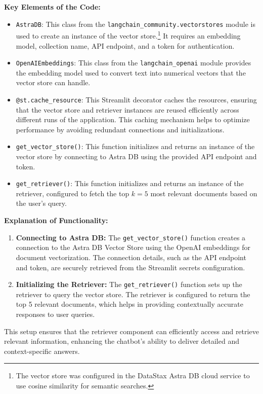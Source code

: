 \textbf{Key Elements of the Code:}
\begin{itemize}
    \item \texttt{AstraDB}: This class from the \texttt{langchain\_community.vectorstores} module is used to create an instance of the vector store.\footnote{The vector store was configured in the DataStax Astra DB cloud service to use cosine similarity for semantic searches.}
    It requires an embedding model, collection name, API endpoint, and a token for authentication.
    \item \texttt{OpenAIEmbeddings}: This class from the \texttt{langchain\_openai} module provides the embedding model used to convert text into numerical vectors that the vector store can handle.
    \item \texttt{@st.cache\_resource}: This Streamlit decorator caches the resources, ensuring that the vector store and retriever instances are reused efficiently across different runs of the application. This caching mechanism helps to optimize performance by avoiding redundant connections and initializations.
    \item \texttt{get\_vector\_store()}: This function initializes and returns an instance of the vector store by connecting to Astra DB using the provided API endpoint and token.
    \item \texttt{get\_retriever()}: This function initializes and returns an instance of the retriever, configured to fetch the top \(k = 5\) most relevant documents based on the user's query.
\end{itemize}

\textbf{Explanation of Functionality:}
\begin{enumerate}
    \item \textbf{Connecting to Astra DB:} The \texttt{get\_vector\_store()} function creates a connection to the Astra DB Vector Store using the OpenAI embeddings for document vectorization. The connection details, such as the API endpoint and token, are securely retrieved from the Streamlit secrets configuration.
    \item \textbf{Initializing the Retriever:} The \texttt{get\_retriever()} function sets up the retriever to query the vector store. The retriever is configured to return the top 5 relevant documents, which helps in providing contextually accurate responses to user queries.
\end{enumerate}

This setup ensures that the retriever component can efficiently access and retrieve relevant information, enhancing the chatbot's ability to deliver detailed and context-specific answers.

